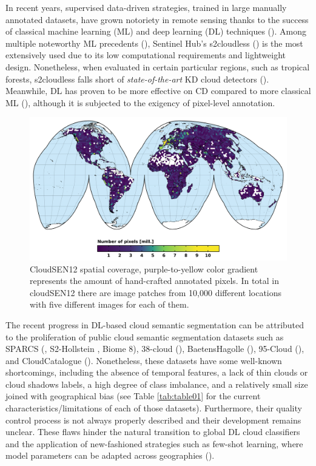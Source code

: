 \documentclass[a4paper, nobind]{templates/cdethesis}
\begin{document}
In recent years, supervised data-driven strategies, trained in large manually annotated datasets, have grown notoriety in remote sensing thanks to the success of classical machine learning (ML) and deep learning (DL) techniques (\cite{Zhu2017}). Among multiple noteworthy ML precedents (\cite{Wei2020,Bai2016,Ghasemian2018}), Sentinel Hub's s2cloudless (\cite{s2cloudless}) is the most extensively used due to its low computational requirements and lightweight design. Nonetheless, when evaluated in certain particular regions, such as tropical forests, s2cloudless falls short of \emph{state-of-the-art} KD cloud detectors (\cite{Sanchez2020, Lopez-Puigdollers2021, CMIXRSE22}). Meanwhile, DL has proven to be more effective on CD compared to more classical ML (\cite{Li2021a, Mahajan2020}), although it is subjected to the exigency of pixel-level annotation.

\begin{figure}[!h]
    \centering
    \includegraphics[width=0.98\linewidth]{figures/chapter01/figure01.png}
    \caption{CloudSEN12 spatial coverage, purple-to-yellow color gradient represents the amount of hand-crafted annotated pixels. In total in cloudSEN12 there are image patches from 10,000 different locations with five different images for each of them.}
    \label{fig:figure01}
\end{figure}

The recent progress in DL-based cloud semantic segmentation can be attributed to the proliferation of public cloud semantic segmentation datasets such as SPARCS (\cite{Hughes2019}, S2-Hollstein \cite{Hollstein2016}, Biome 8\cite{Foga2017}), 38-cloud (\cite{Mohajerani2019}), BaetensHagolle (\cite{Baetens2019}), 95-Cloud (\cite{Mohajerani2020a}), and CloudCatalogue (\cite{francis_alistair_2020_4172871}). Nonetheless, these datasets have some well-known shortcomings, including the absence of temporal features, a lack of thin clouds or cloud shadows labels, a high degree of class imbalance, and a relatively small size joined with geographical bias (see Table \ref{tab:table01} for the current characteristics/limitations of each of those datasets). Furthermore, their quality control process is not always properly described and their development remains unclear. These flaws hinder the natural transition to global DL cloud classifiers and the application of new-fashioned strategies such as few-shot learning, where model parameters can be adapted across geographies (\cite{russwurm2020meta}).
\end{document}
